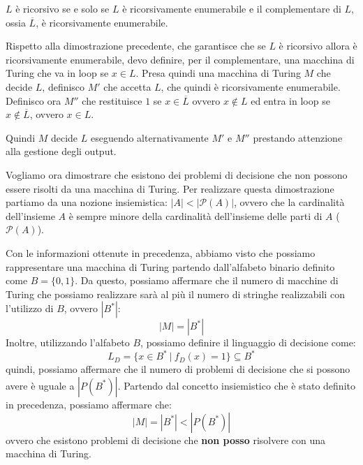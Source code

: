 \begin{teorema} \label{teo-rec-en-comp}
    $L$ è ricorsivo se e solo se $L$ è ricorsivamente enumerabile e il
    complementare di $L$, ossia $\overline{L}$, è ricorsivamente enumerabile.
\end{teorema}
\begin{dimostrazione}
    Rispetto alla dimostrazione precedente, che garantisce che se $L$ è ricorsivo
    allora è ricorsivamente enumerabile, devo definire, per il complementare,
    una macchina di Turing che va in loop se $x \in L$. Presa quindi una macchina
    di Turing $M$ che decide $L$, definisco $M'$ che accetta $L$, che quindi è
    ricorsivamente enumerabile. Definisco ora $M''$ che restituisce $1$ se
    $x \in \overline{L}$ ovvero $x \not\in L$ ed entra in loop se $x \not\in
        \overline{L}$, ovvero $x \in L$.

    Quindi $M$ decide $L$ eseguendo alternativamente $M'$ e $M''$ prestando
    attenzione alla gestione degli output.
\end{dimostrazione}
Vogliamo ora dimostrare che esistono dei problemi di decisione che non possono
essere risolti da una macchina di Turing. Per realizzare questa dimostrazione
partiamo da una nozione insiemistica: $|A| < |\mathcal{P}(A)|$, ovvero che la
cardinalità dell'insieme $A$ è sempre minore della cardinalità dell'insieme delle
parti di $A$ ($\mathcal{P}(A)$).

Con le informazioni ottenute in precedenza, abbiamo visto che possiamo
rappresentare una macchina di Turing partendo dall'alfabeto binario definito
come $B = \{0, 1\}$. Da questo, possiamo affermare che il numero di macchine di
Turing che possiamo realizzare sarà al più il numero di stringhe realizzabili
con l'utilizzo di $B$, ovvero $|B^{\ast}|$:
\begin{equation}
    |M| = |B^{\ast}|
\end{equation}
Inoltre, utilizzando l'alfabeto $B$, possiamo definire il linguaggio di
decisione come:
\begin{equation}
    L_D = \{x \in B^{\ast} \ | \ f_D(x) = 1\} \subseteq B^{\ast}
\end{equation}
quindi, possiamo affermare che il numero di problemi di decisione che si possono
avere è uguale a $|P(B^{\ast})|$. Partendo dal concetto insiemistico che è stato
definito in precedenza, possiamo affermare che:
\begin{equation}
    |M| = |B^{\ast}| < |P(B^{\ast})|
\end{equation}
ovvero che esistono problemi di decisione che \textbf{non posso} risolvere con
una macchina di Turing.
